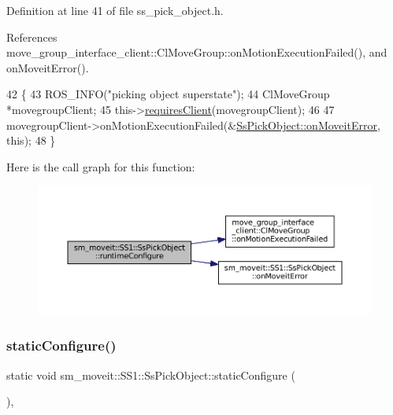 Definition at line 41 of file ss\+\_\+pick\+\_\+object.\+h.



References move\+\_\+group\+\_\+interface\+\_\+client\+::\+Cl\+Move\+Group\+::on\+Motion\+Execution\+Failed(), and on\+Moveit\+Error().


\begin{DoxyCode}
42     \{
43         ROS\_INFO(\textcolor{stringliteral}{"picking object superstate"});
44         ClMoveGroup *movegroupClient;
45         this->\hyperlink{classsmacc_1_1ISmaccState_a7f95c9f0a6ea2d6f18d1aec0519de4ac}{requiresClient}(movegroupClient);
46 
47         movegroupClient->onMotionExecutionFailed(&\hyperlink{structsm__moveit_1_1SS1_1_1SsPickObject_aa5ad4c6436b70a13b27a45936876374c}{SsPickObject::onMoveitError}, \textcolor{keyword}{
      this});
48     \}
\end{DoxyCode}
Here is the call graph for this function\+:
\nopagebreak
\begin{figure}[H]
\begin{center}
\leavevmode
\includegraphics[width=350pt]{structsm__moveit_1_1SS1_1_1SsPickObject_acb8cbbad6e452a98ff2ccf93a6bdd1a4_cgraph}
\end{center}
\end{figure}
\mbox{\label{structsm__moveit_1_1SS1_1_1SsPickObject_ab589ae81913b79dda9f94d03e5b0fa86}} 
\subsubsection{\texorpdfstring{static\+Configure()}{staticConfigure()}}
{\footnotesize\ttfamily static void sm\+\_\+moveit\+::\+S\+S1\+::\+Ss\+Pick\+Object\+::static\+Configure (\begin{DoxyParamCaption}{ }\end{DoxyParamCaption})\hspace{0.3cm}{\ttfamily [inline]}, {\ttfamily [static]}}



